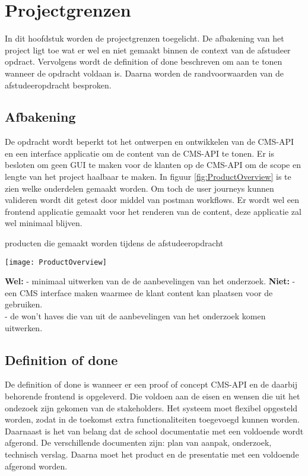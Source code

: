 \chapter{Projectgrenzen}
In dit hoofdstuk worden de projectgrenzen toegelicht.
De afbakening van het project ligt toe wat er wel en niet gemaakt binnen de context van de afstudeer opdract.
Vervolgens wordt de definition of done beschreven om aan te tonen wanneer de opdracht voldaan is.
Daarna worden de randvoorwaarden van de afstudeeropdracht besproken.
\section{Afbakening}
De opdracht wordt beperkt tot het ontwerpen en ontwikkelen van de \gls{CMS}-API en een interface applicatie om de content van de \gls{CMS}-API te tonen.
Er is besloten om geen \gls{GUI} te maken voor de klanten op de \gls{CMS}-API om de scope en lengte van het project haalbaar te maken.
In figuur \ref{fig:ProductOverview} is te zien welke onderdelen gemaakt worden.
Om toch de user journeys kunnen valideren wordt dit getest door middel van postman workflows.
Er wordt wel een frontend applicatie gemaakt voor het renderen van de content, deze applicatie zal wel minimaal blijven.
\begin{graphic}
    \captionsetup{type=figure}
    \caption{producten die gemaakt worden tijdens de afstudeeropdracht}
    \texttt{[image: ProductOverview]}
    \label{fig:ProductOverview}
\end{graphic}
\whitespace
\textbf{Wel:}
\whitespace
- minimaal uitwerken van de  de aanbevelingen van het onderzoek.
\textbf{Niet:}
\whitespace
- een \gls{CMS} interface maken waarmee de klant content kan plaatsen voor de gebruiken.\\
- de won't haves die van uit de aanbevelingen van het onderzoek komen uitwerken.
\section{Definition of done}
De definition of done is wanneer er een proof of concept CMS-API en de daarbij behorende frontend is opgeleverd. 
Die voldoen aan de eisen en wensen die uit het ondezoek zijn gekomen van de stakeholders.
Het systeem moet flexibel opgesteld worden, zodat in de toekomst extra functionaliteiten toegevoegd kunnen worden.
Daarnaast is het van belang dat de school documentatie met een voldoende wordt afgerond.
De verschillende documenten zijn: plan van aanpak, onderzoek, technisch verslag.
Daarna moet het product en de presentatie met een voldoende afgerond worden.
